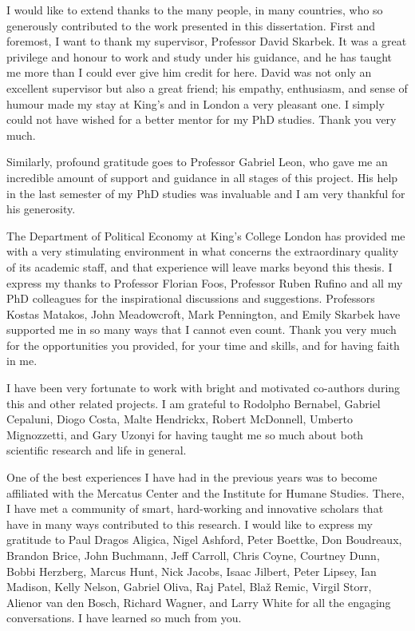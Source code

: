 \documentclass[a4paper,12pt]{report}
\begin{document}
I would like to extend thanks to the many people, in many countries, who so generously contributed to the work presented in this dissertation. First and foremost, I want to thank my supervisor, Professor David Skarbek. It was a great privilege and honour to work and study under his guidance, and he has taught me more than I could ever give him credit for here. David was not only an excellent supervisor but also a great friend; his empathy, enthusiasm, and sense of humour made my stay at King's and in London a very pleasant one. I simply could not have wished for a better mentor for my PhD studies. Thank you very much.

Similarly, profound gratitude goes to Professor Gabriel Leon, who gave me an incredible amount of support and guidance in all stages of this project. His help in the last semester of my PhD studies was invaluable and I am very thankful for his generosity.

The Department of Political Economy at King's College London has provided me with a very stimulating environment in what concerns the extraordinary quality of its academic staff, and that experience will leave marks beyond this thesis. I express my thanks to Professor Florian Foos, Professor Ruben Rufino and all my PhD colleagues for the inspirational discussions and suggestions. Professors Kostas Matakos, John Meadowcroft, Mark Pennington, and Emily Skarbek have supported me in so many ways that I cannot even count. Thank you very much for the opportunities you provided, for your time and skills, and for having faith in me.

I have been very fortunate to work with bright and motivated co-authors during this and other related projects. I am grateful to Rodolpho Bernabel, Gabriel Cepaluni, Diogo Costa, Malte Hendrickx, Robert McDonnell, Umberto Mignozzetti, and Gary Uzonyi for having taught me so much about both scientific research and life in general.

One of the best experiences I have had in the previous years was to become affiliated with the Mercatus Center and the Institute for Humane Studies. There, I have met a community of smart, hard-working and innovative scholars that have in many ways contributed to this research. I would like to express my gratitude to Paul Dragos Aligica, Nigel Ashford, Peter Boettke, Don Boudreaux, Brandon Brice, John Buchmann, Jeff Carroll, Chris Coyne, Courtney Dunn, Bobbi Herzberg, Marcus Hunt, Nick Jacobs, Isaac Jilbert, Peter Lipsey, Ian Madison, Kelly Nelson, Gabriel Oliva, Raj Patel, Blaž Remic, Virgil Storr, Alienor van den Bosch, Richard Wagner, and Larry White for all the engaging conversations. I have learned so much from you.
\end{document}
